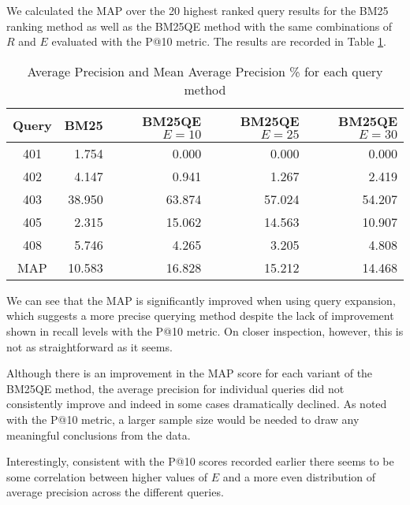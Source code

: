 We calculated the MAP over the 20 highest ranked query results for the BM25 ranking method as well as the BM25QE method with the same combinations of $R$ and $E$ evaluated with the P@10 metric. The results are recorded in Table \ref{table:MAPresult}.

\begin{table}
\begin{center}
\begin{tabular}{ c | r r r r }
	\textbf{Query} & BM25 & BM25QE $E=10$&BM25QE $E=25$&BM25QE $E=30$\\
	\hline
	401 &  1.754 &  0.000 &  0.000 &  0.000\\
	402 &  4.147 &  0.941 &  1.267 &  2.419\\
	403 & 38.950 & 63.874 & 57.024 & 54.207\\
	405 &  2.315 & 15.062 & 14.563 & 10.907\\
	408 &  5.746 &  4.265 &  3.205 &  4.808\\
	\hline
	MAP & 10.583 & 16.828 & 15.212 & 14.468\\
\end{tabular}
\end{center}
\caption {Average Precision and Mean Average Precision \% for each query method}\label{table:MAPresult}
\end{table}

We can see that the MAP is significantly improved when using query expansion, which suggests a more precise querying method despite the lack of improvement shown in recall levels with the P@10 metric. On closer inspection, however, this is not as straightforward as it seems.

Although there is an improvement in the MAP score for each variant of the BM25QE method, the average precision for individual queries did not consistently improve and indeed in some cases dramatically declined. As noted with the P@10 metric, a larger sample size would be needed to draw any meaningful conclusions from the data.

Interestingly, consistent with the P@10 scores recorded earlier there seems to be some correlation between higher values of $E$ and a more even distribution of average precision across the different queries.
